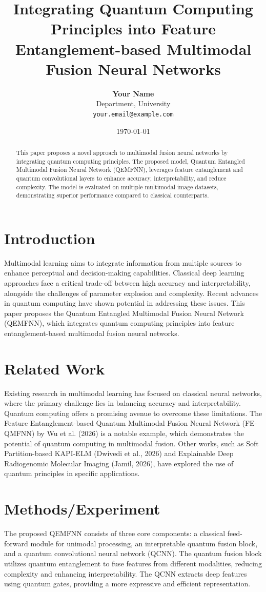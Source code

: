 \documentclass[12pt]{article}
\title{Integrating Quantum Computing Principles into Feature Entanglement-based Multimodal Fusion Neural Networks}
\author{
    \textbf{Your Name} \\
    Department, University \\
    \texttt{your.email@example.com}
}
\date{\today}
\begin{document}
\maketitle

\begin{abstract}
This paper proposes a novel approach to multimodal fusion neural networks by integrating quantum computing principles. The proposed model, Quantum Entangled Multimodal Fusion Neural Network (QEMFNN), leverages feature entanglement and quantum convolutional layers to enhance accuracy, interpretability, and reduce complexity. The model is evaluated on multiple multimodal image datasets, demonstrating superior performance compared to classical counterparts.
\end{abstract}

\section{Introduction}
Multimodal learning aims to integrate information from multiple sources to enhance perceptual and decision-making capabilities. Classical deep learning approaches face a critical trade-off between high accuracy and interpretability, alongside the challenges of parameter explosion and complexity. Recent advances in quantum computing have shown potential in addressing these issues. This paper proposes the Quantum Entangled Multimodal Fusion Neural Network (QEMFNN), which integrates quantum computing principles into feature entanglement-based multimodal fusion neural networks.

\section{Related Work}
Existing research in multimodal learning has focused on classical neural networks, where the primary challenge lies in balancing accuracy and interpretability. Quantum computing offers a promising avenue to overcome these limitations. The Feature Entanglement-based Quantum Multimodal Fusion Neural Network (FE-QMFNN) by Wu et al. (2026) is a notable example, which demonstrates the potential of quantum computing in multimodal fusion. Other works, such as Soft Partition-based KAPI-ELM (Dwivedi et al., 2026) and Explainable Deep Radiogenomic Molecular Imaging (Jamil, 2026), have explored the use of quantum principles in specific applications.

\section{Methods/Experiment}
The proposed QEMFNN consists of three core components: a classical feed-forward module for unimodal processing, an interpretable quantum fusion block, and a quantum convolutional neural network (QCNN). The quantum fusion block utilizes quantum entanglement to fuse features from different modalities, reducing complexity and enhancing interpretability. The QCNN extracts deep features using quantum gates, providing a more expressive and efficient representation.
\end{document}
